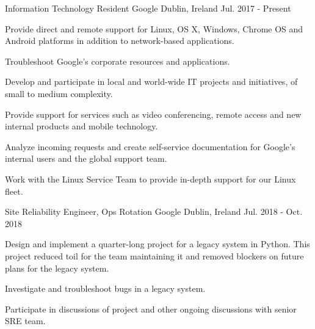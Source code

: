 

\begin{cventries}

  \cventry
    {Information Technology Resident} %
    {Google} %
    {Dublin, Ireland} %
    {Jul. 2017 - Present} %
    {
      \begin{cvitems} %
        \item {Provide direct and remote support for Linux, OS X, Windows, Chrome OS and Android platforms in addition to network-based applications.}
        \item {Troubleshoot Google’s corporate resources and applications.}
        \item {Develop and participate in local and world-wide IT projects and initiatives, of small to medium complexity.}
        \item {Provide support for services such as video conferencing, remote access and new internal products and mobile technology.}
        \item {Analyze incoming requests and create self-service documentation for Google’s internal users and the global support team.}
        \item{Work with the Linux Service Team to provide in-depth support for our Linux fleet.} 
      \end{cvitems}
    }
 
  \cventry
    {Site Reliability Engineer, Ops Rotation} %
    {Google} %
    {Dublin, Ireland} %
    {Jul. 2018 - Oct. 2018} %
    {
      \begin{cvitems} %
        \item {Design and implement a quarter-long project for a legacy system in Python. This project reduced toil for the team maintaining it and removed blockers on future plans for the legacy system.}
        \item {Investigate and troubleshoot bugs in a legacy system.}
        \item {Participate in discussions of project and other ongoing discussions with senior SRE team.}
      \end{cvitems}
    }


\end{cventries}
